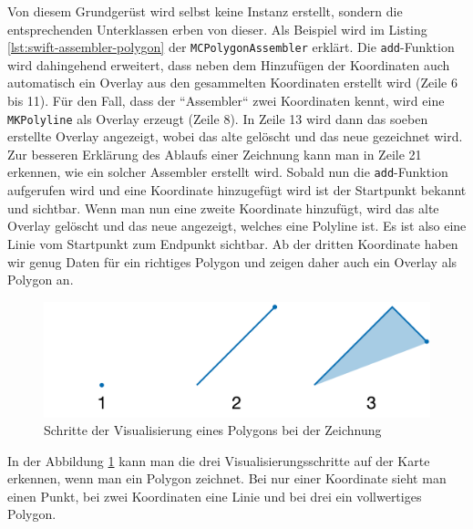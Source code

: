Von diesem Grundgerüst wird selbst keine Instanz erstellt, sondern die entsprechenden Unterklassen erben von dieser.\pbreak%
Als Beispiel wird im Listing \ref{lst:swift-assembler-polygon} der \texttt{MCPolygonAssembler} erklärt.
Die \texttt{add}-Funktion wird dahingehend erweitert, dass neben dem Hinzufügen der Koordinaten auch automatisch ein Overlay aus den gesammelten Koordinaten erstellt wird (Zeile 6 bis 11).
Für den Fall, dass der ``Assembler`` zwei Koordinaten kennt, wird eine \texttt{MKPolyline} als Overlay erzeugt (Zeile 8).
In Zeile 13 wird dann das soeben erstellte Overlay angezeigt, wobei das alte gelöscht und das neue gezeichnet wird.
Zur besseren Erklärung des Ablaufs einer Zeichnung kann man in Zeile 21 erkennen, wie ein solcher Assembler erstellt wird.
Sobald nun die \texttt{add}-Funktion aufgerufen wird und eine Koordinate hinzugefügt wird ist der Startpunkt bekannt und sichtbar.
Wenn man nun eine zweite Koordinate hinzufügt, wird das alte Overlay gelöscht und das neue angezeigt, welches eine Polyline ist.
Es ist also eine Linie vom Startpunkt zum Endpunkt sichtbar.
Ab der dritten Koordinate haben wir genug Daten für ein richtiges Polygon und zeigen daher auch ein Overlay als Polygon an.
\begin{figure}[h]
	\centering
	\includegraphics[scale=0.25]{images/assembler.png}
	\caption{Schritte der Visualisierung eines Polygons bei der Zeichnung}
	\label{fig:assembler}
\end{figure}
In der Abbildung \ref{fig:assembler} kann man die drei Visualisierungsschritte auf der Karte erkennen, wenn man ein Polygon zeichnet.
Bei nur einer Koordinate sieht man einen Punkt, bei zwei Koordinaten eine Linie und bei drei ein vollwertiges Polygon.

